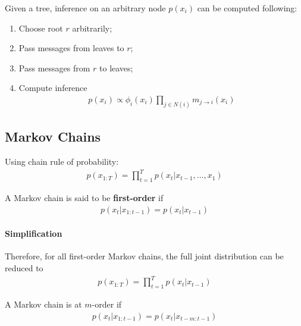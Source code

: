 \documentclass{article}
\begin{document}
	\begin{algorithm}
		Given a tree, inference on an arbitrary node $p(x_i)$ can be computed following:
		\begin{enumerate}
			\item Choose root $r$ arbitrarily;
			\item Pass messages from leaves to $r$;
			\item Pass messages from $r$ to leaves;
			\item Compute inference
			\begin{align}
				p\left(x_{i}\right) \propto \phi_{i}\left(x_{i}\right) \prod_{j \in N(i)} m_{j \rightarrow i}\left(x_{i}\right)
			\end{align}
		\end{enumerate}
	\end{algorithm}
	
	\subsection{Markov Chains}
	\par Using chain rule of probability:
	\begin{align}
		p\left(x_{1: T}\right)=\prod_{t=1}^{T} p\left(x_{t} | x_{t-1}, \ldots, x_{1}\right)
	\end{align}
	
	\begin{definition}
		A Markov chain is said to be \textbf{first-order} if 
		\begin{align}
			p\left(x_{t} | x_{1: t-1}\right)=p\left(x_{t} | x_{t-1}\right)
		\end{align}
	\end{definition}
	
	\paragraph{Simplification} Therefore, for all first-order Markov chains, the full joint distribution can be reduced to
	\begin{align}
		p\left(x_{1: T}\right)=\prod_{t=1}^{T} p\left(x_{t} | x_{t-1}\right)
	\end{align}
	
	\begin{definition}
		A Markov chain is at $m$-order if
		\begin{align}
			p\left(x_{t} | x_{1: t-1}\right)=p\left(x_{t} | x_{t-m: t-1}\right)
		\end{align}
	\end{definition}
	
\end{document}
